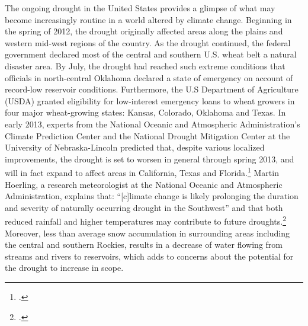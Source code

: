 The ongoing drought in the United States provides a glimpse of what may become increasingly routine in a world altered by climate change.
Beginning in the spring of 2012, the drought originally affected areas along the plains and western mid-west regions of the country. 
As the drought continued, the federal government declared most of the central and southern U.S. wheat belt a natural disaster area. 
By July, the drought had reached such extreme conditions that officials in north-central Oklahoma declared a state of emergency on account of record-low reservoir conditions. 
Furthermore, the U.S Department of Agriculture (USDA) granted eligibility for low-interest emergency loans to wheat growers in four major wheat-growing states: Kansas, Colorado, Oklahoma and Texas. 
In early 2013, experts from the National Oceanic and Atmospheric Administration's Climate Prediction Center and the National Drought Mitigation Center at the University of Nebraska-Lincoln predicted that, despite various localized improvements, the drought is set to worsen in general through spring 2013, and will in fact expand to affect areas in California, Texas and Florida.\footcite[][]{NOAAteleconf2013}
Martin Hoerling, a research meteorologist at the National Oceanic and Atmospheric Administration, explains that: ``[c]limate change is likely prolonging the duration and severity of naturally occurring drought in the Southwest'' and that both reduced rainfall and higher temperatures may contribute to future droughts.\footcite[][]{USHeatAndDrought}
Moreover, less than average snow accumulation in surrounding areas including the central and southern Rockies, results in a decrease of water flowing from streams and rivers to reservoirs, which adds to concerns about the potential for the drought to increase in scope.



